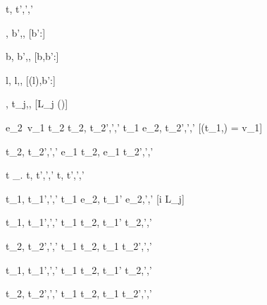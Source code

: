 

  {t,\sigma {} t',\sigma',\delta'}



  { }
  {\Enter \beta,\sigma {} \Update b',\sigma,\nothing}
  [b':\beta]

  { }
  {\Update b,\sigma {} \Update b',\sigma,\nothing}
  [b,b':\beta]

  { }
  {\Change l,\sigma {} \Change l,\sigma[l \mapsto b'],}
  [\sigma(l),b':\beta]



	{ }
	{\Pick{},\sigma {} t_j,\sigma,\nothing}
  [L_j \in \Picks(\Pick{})]



	{e_2\ v_1 \eval t_2 \Quad
   t_2,\sigma {} t_2',\sigma',\delta'}
  {t_1 \Step e_2,\sigma {} t_2',\sigma',\delta'}
  [\Value(t_1,\sigma) = v_1]



	{t_2,\sigma {} t_2',\sigma',\delta'}
	{e_1 \Trans t_2,\sigma {} e_1 \Trans t_2',\sigma',\delta'}

  {t \Step \lambda\_. \Forever t,\sigma {} t',\sigma',\delta'}
  {\Forever t,\sigma {} t',\sigma',\delta'}

  {t_1,\sigma {} t_1',\sigma',\delta'}
  {t_1 \Step e_2,\sigma {} t_1' \Step e_2,\sigma',\delta'}
  [i \neq \IContinue L_j]

  {t_1,\sigma {} t_1',\sigma',\delta'}
  {t_1 \Pair t_2,\sigma {} t_1' \Pair t_2,\sigma',\delta'}

  {t_2,\sigma {} t_2',\sigma',\delta'}
  {t_1 \Pair t_2,\sigma {} t_1 \Pair t_2',\sigma',\delta'}

  {t_1,\sigma {} t_1',\sigma',\delta'}
  {t_1 \Choose t_2,\sigma {} t_1' \Choose t_2,\sigma',\delta'}

  {t_2,\sigma {} t_2',\sigma',\delta'}
  {t_1 \Choose t_2,\sigma {} t_1 \Choose t_2',\sigma',\delta'}


